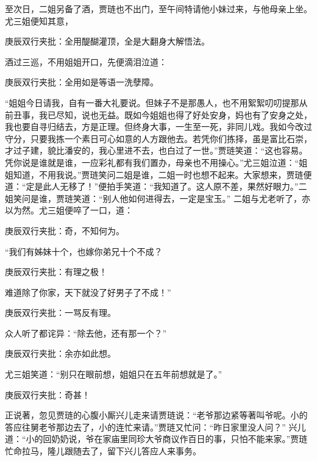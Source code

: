 \begin{parag}
    至次日，二姐另备了酒，贾琏也不出门，至午间特请他小妹过来，与他母亲上坐。尤三姐便知其意，\begin{note}庚辰双行夹批：全用醍醐灌顶，全是大翻身大解悟法。\end{note}酒过三巡，不用姐姐开口，先便滴泪泣道：\begin{note}庚辰双行夹批：全用如是等语一洗孽障。\end{note}“姐姐今日请我，自有一番大礼要说。但妹子不是那愚人，也不用絮絮叨叨提那从前丑事，我已尽知，说也无益。既如今姐姐也得了好处安身，妈也有了安身之处，我也要自寻归结去，方是正理。但终身大事，一生至一死，非同儿戏。我如今改过守分，只要我拣一个素日可心如意的人方跟他去。若凭你们拣择，虽是富比石崇，才过子建，貌比潘安的，我心里进不去，也白过了一世。”贾琏笑道：“这也容易。凭你说是谁就是谁，一应彩礼都有我们置办，母亲也不用操心。”尤三姐泣道：“姐姐知道，不用我说。”贾琏笑问二姐是谁，二姐一时也想不起来。大家想来，贾琏便道：“定是此人无移了！”便拍手笑道：“我知道了。这人原不差，果然好眼力。”二姐笑问是谁，贾琏笑道：“别人他如何进得去，一定是宝玉。” 二姐与尤老听了，亦以为然。尤三姐便啐了一口，道：\begin{note}庚辰双行夹批：奇，不知何为。\end{note}“我们有姊妹十个，也嫁你弟兄十个不成？\begin{note}庚辰双行夹批：有理之极！\end{note}难道除了你家，天下就没了好男子了不成！”\begin{note}庚辰双行夹批：一骂反有理。\end{note}众人听了都诧异：“除去他，还有那一个？”\begin{note}庚辰双行夹批：余亦如此想。\end{note}尤三姐笑道：“别只在眼前想，姐姐只在五年前想就是了。”\begin{note}庚辰双行夹批：奇甚！\end{note}
\end{parag}


\begin{parag}
    正说著，忽见贾琏的心腹小厮兴儿走来请贾琏说：“老爷那边紧等著叫爷呢。小的答应往舅老爷那边去了，小的连忙来请。”贾琏又忙问：“昨日家里没人问？” 兴儿道：“小的回奶奶说，爷在家庙里同珍大爷商议作百日的事，只怕不能来家。”贾琏忙命拉马，隆儿跟随去了，留下兴儿答应人来事务。
\end{parag}



